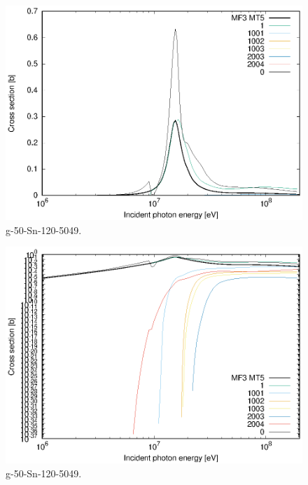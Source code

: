 \begin{figure}
 \includegraphics[width=\linewidth]{eps/g_50-Sn-120_5049.eps}
  \caption{g-50-Sn-120-5049.}
\end{figure}
\begin{figure}
 \includegraphics[width=\linewidth]{eps-log/g_50-Sn-120_5049.eps}
 \caption{g-50-Sn-120-5049.}
\end{figure}
\newpage \clearpage

